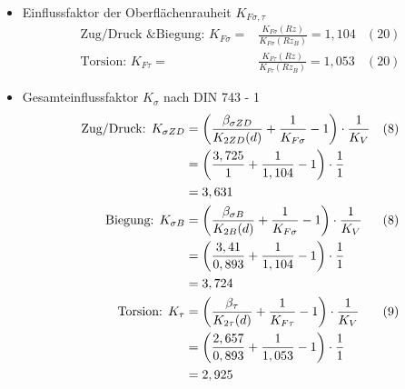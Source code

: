 \begin{itemize}
\begin{align*}
	\end{align*}
\item Einflussfaktor der Oberflächenrauheit $K_{F\sigma, \tau} $
	\begin{align*}
	\text{Zug/Druck \& Biegung: } K_{F\sigma} =&\frac{K_{F\sigma} (Rz)}{K_{F\sigma} (Rz_B)} = 1,104 &(20) \\
	\text{Torsion: } K_{F\tau} = &\frac{K_{F\tau} (Rz)}{K_{F\tau} (Rz_B)} = 1,053 &(20)
	\end{align*}
\item Gesamteinflussfaktor $K_{\sigma}$ nach DIN 743 - 1
	\begin{align*}
	\text{Zug/Druck: } K_{\sigma ZD} &= \left( \frac{\beta_{\sigma ZD}}{K_{2ZD} (d)} + \frac{1}{K_{F\sigma}} -1\right) \cdot \frac{1}{K_V} & (8) \\
	&= \left( \frac{3,725}{1} + \frac{1}{1,104} -1\right) \cdot \frac{1}{1} \\
	&= 3,631 \\
	\text{Biegung: } K_{\sigma B} &= \left( \frac{\beta_{\sigma B}}{K_{2B}(d)} + \frac{1}{K_{F\sigma}} -1\right) \cdot \frac{1}{K_V} & (8) \\
	&= \left( \frac{3,41}{0,893} + \frac{1}{1,104} -1\right) \cdot \frac{1}{1} \\
	&= 3,724 \\
	\text{Torsion: } K_{\tau} &= \left( \frac{\beta_{\tau}}{K_{2\tau}(d)} + \frac{1}{K_{F\tau}} -1\right) \cdot \frac{1}{K_V} & (9) \\
	&= \left( \frac{2,657}{0,893} + \frac{1}{1,053} -1\right) \cdot \frac{1}{1} \\
	&= 2,925 
	\end{align*}
\end{itemize}
